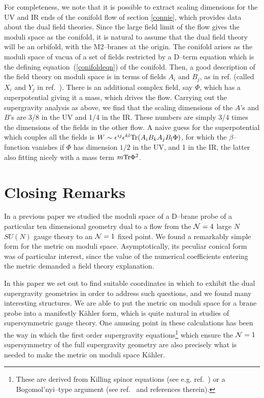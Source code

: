 \documentclass[a4paper,12pt]{article}
\newcommand{\reef}[1]{(\ref{#1})}
\begin{document}
For completeness, we note that it is possible to extract scaling
dimensions for the UV and IR ends of the conifold flow of section
\ref{connie}, which provides data about the dual field theories. Since
the large field limit of the flow gives the moduli space as the
conifold, it is natural to assume that the dual field theory will be
an orbifold, with the M2--branes at the origin. The conifold arises as
the moduli space of vacua of a set of fields restricted by a D--term
equation which is the defining equation~\reef{conifoldeqn} of the
conifold. Then, a good description of the field theory on moduli space
is in terms of fields $A_i$ and $B_j$, as in ref.\cite{kw}
(called $X_i$ and $Y_j$ in ref.~\cite{mp}). There is an additional
complex field, say $\Phi$, which has a superpotential giving it a
mass, which drives the flow.  Carrying out the supergravity analysis
as above, we find that the scaling dimensions of the $A$'s and $B$'s
are 3/8 in the UV and 1/4 in the IR.  These numbers are simply 3/4
times the dimensions of the fields in the other flow. A naive guess
for the superpotential which couples all the fields is $W \sim
\epsilon^{ij}\epsilon^{kl}{\rm Tr}(A_i B_k A_j B_l \Phi)$, for which
the $\beta$--function vanishes if $\Phi$ has dimension $1/2$ in the
UV, and 1 in the IR, the latter also fitting nicely with a mass term
$m{\rm Tr}\Phi^2$.

\section{Closing Remarks}

In a previous paper\cite{jlp} we studied the moduli space of a
D--brane probe of a particular ten dimensional geometry dual to a flow
from the ${\cal N}=4$ large $N$ $SU(N)$ gauge theory to an ${\cal
  N}=1$ fixed point. We found a remarkably simple form for the metric
on moduli space. Asymptotically, its peculiar conical form was of
particular interest, since the value of the numerical coefficients
entering the metric demanded a field theory explanation.

In this paper we set out to find suitable coordinates in which to
exhibit the dual supergravity geometries in order to address such
questions, and we found many interesting structures.  We are able to
put the metric on moduli space for a brane probe into a manifestly
K\"ahler form, which is quite natural in  studies of
supersymmetric gauge theory. One amusing point in these calculations
has been the way in which the first order supergravity
equations\footnote{These are derived from Killing spinor equations
  (see e.g. ref.~\cite{freed1}) or a Bogomol'nyi--type argument (see
  ref.~\cite{bakas2} and references therein).} which ensure the ${\cal
  N} = 1$ supersymmetry of the full supergravity geometry are also
precisely what is needed to make the metric on moduli space K\"ahler.
\end{document}
